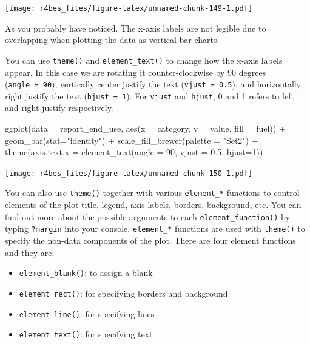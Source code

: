 \documentclass[
]{book}
\newenvironment{Shaded}{\begin{snugshade}}{\end{snugshade}}
\newcommand{\AttributeTok}[1]{\textcolor[rgb]{0.77,0.63,0.00}{#1}}
\newcommand{\DecValTok}[1]{\textcolor[rgb]{0.00,0.00,0.81}{#1}}
\newcommand{\FloatTok}[1]{\textcolor[rgb]{0.00,0.00,0.81}{#1}}
\newcommand{\FunctionTok}[1]{\textcolor[rgb]{0.00,0.00,0.00}{#1}}
\newcommand{\NormalTok}[1]{#1}
\newcommand{\SpecialCharTok}[1]{\textcolor[rgb]{0.00,0.00,0.00}{#1}}
\newcommand{\StringTok}[1]{\textcolor[rgb]{0.31,0.60,0.02}{#1}}
\providecommand{\tightlist}{%
  \setlength{\itemsep}{0pt}\setlength{\parskip}{0pt}}
\begin{document}
\texttt{[image: r4bes\_files/figure-latex/unnamed-chunk-149-1.pdf]}

As you probably have noticed. The x-axis labels are not legible due to overlapping when plotting the data as vertical bar charts.

You can use \texttt{theme()} and \texttt{element\_text()} to change how the x-axis labels appear. In this case we are rotating it counter-clockwise by 90 degrees (\texttt{angle\ =\ 90}), vertically center justify the text (\texttt{vjust\ =\ 0.5}), and horizontally right justify the text (\texttt{hjust\ =\ 1}). For \texttt{vjust} and \texttt{hjust}, 0 and 1 refers to left and right justify respectively.

\begin{Shaded}
\begin{Highlighting}[]
\FunctionTok{ggplot}\NormalTok{(}\AttributeTok{data =}\NormalTok{ report\_end\_use, }\FunctionTok{aes}\NormalTok{(}\AttributeTok{x =}\NormalTok{ category, }\AttributeTok{y =}\NormalTok{ value, }\AttributeTok{fill =}\NormalTok{ fuel)) }\SpecialCharTok{+}
    \FunctionTok{geom\_bar}\NormalTok{(}\AttributeTok{stat=}\StringTok{"identity"}\NormalTok{) }\SpecialCharTok{+} 
    \FunctionTok{scale\_fill\_brewer}\NormalTok{(}\AttributeTok{palette =} \StringTok{"Set2"}\NormalTok{) }\SpecialCharTok{+}
    \FunctionTok{theme}\NormalTok{(}\AttributeTok{axis.text.x =} \FunctionTok{element\_text}\NormalTok{(}\AttributeTok{angle =} \DecValTok{90}\NormalTok{, }\AttributeTok{vjust =} \FloatTok{0.5}\NormalTok{, }\AttributeTok{hjust=}\DecValTok{1}\NormalTok{))}
\end{Highlighting}
\end{Shaded}

\texttt{[image: r4bes\_files/figure-latex/unnamed-chunk-150-1.pdf]}

You can also use \texttt{theme()} together with various \texttt{element\_*} functions to control elements of the plot title, legend, axis labels, borders, background, etc. You can find out more about the possible arguments to each \texttt{element\_function()} by typing \texttt{?margin} into your console. \texttt{element\_*} functions are used with \texttt{theme()} to specify the non-data components of the plot. There are four element functions and they are:

\begin{itemize}
\tightlist
\item
  \texttt{element\_blank()}: to assign a blank
\item
  \texttt{element\_rect()}: for specifying borders and background
\item
  \texttt{element\_line()}: for specifying lines
\item
  \texttt{element\_text()}: for specifying text
\end{itemize}
\end{document}
